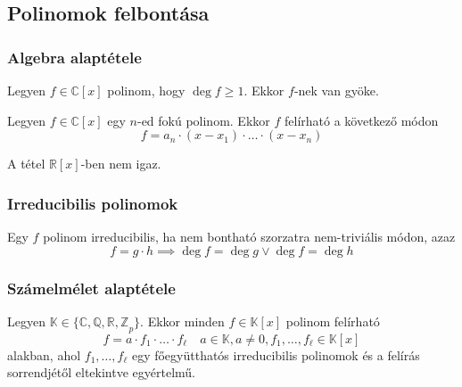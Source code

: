 \setcounter{definition}{0}
\setcounter{theorem}{0}
\subsection{Polinomok felbontása}
\subsubsection{Algebra alaptétele}
\begin{theorem}
	Legyen $f \in \mathbb{C}[x]$ polinom, hogy $\deg f \geq 1$.
	Ekkor $f$-nek van gyöke.
\end{theorem}
\begin{theorem}
	Legyen $f \in \mathbb{C}[x]$ egy $n$-ed fokú polinom.
	Ekkor $f$ felírható a következő módon
	\begin{equation*}
		f = a_n \cdot (x - x_1) \cdot \dots \cdot (x - x_n)
	\end{equation*}
\end{theorem}
\begin{remark*}
	A tétel $\mathbb{R}[x]$-ben nem igaz.
\end{remark*}
\subsubsection{Irreducibilis polinomok}
\begin{definition}
	Egy $f$ polinom irreducibilis,
	ha nem bontható szorzatra nem-triviális módon, azaz
	\begin{equation*}
		f = g \cdot h \implies \deg f = \deg g \lor \deg f = \deg h
	\end{equation*}
\end{definition}
\subsubsection{Számelmélet alaptétele}
\begin{theorem}
	Legyen $\mathbb{K} \in \{ \mathbb{C, Q, R, Z}_p \}$.
	Ekkor minden $f \in \mathbb{K}[x]$ polinom felírható
	\begin{equation*}
		f = a \cdot f_1 \cdot \dots \cdot f_\ell \quad
		a \in \mathbb{K}, a \neq 0, f_1, \dots, f_\ell \in \mathbb{K}[x]
	\end{equation*}
	alakban, ahol $f_1, \dots, f_\ell$ egy főegyütthatós irreducibilis polinomok
	és a felírás sorrendjétől eltekintve egyértelmű.
\end{theorem}
